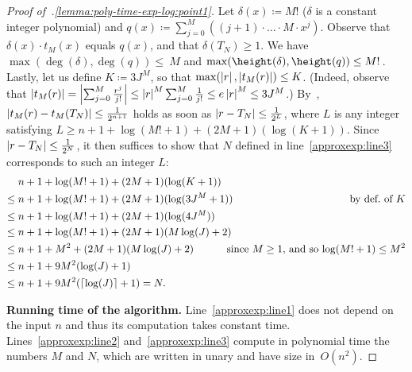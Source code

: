 \begin{proof}[Proof of~.\ref{lemma:poly-time-exp-log:point1}]
  Let $\delta(x) \coloneqq M!$ ($\delta$ is a constant integer polynomial) and
  $q(x) \coloneqq \sum_{j=0}^M ((j+1) \cdot {\dots} \cdot M \cdot x^j)$. Observe
  that $\delta(x) \cdot t_M(x)$ equals $q(x)$, and that $\delta(T_N) \geq 1$. We
  have $\max(\deg(\delta),\deg(q)) \leq~M$ and $\max(\height(\delta),\height(q))
  \leq M!\,$. Lastly, let us define $K \coloneqq 3J^M$, so that
  $\max(\left|r\right|,\left|t_M(r)\right|) \leq K$. (Indeed, observe that $\left|t_M(r)\right| =
  \left|\sum_{j=0}^M \frac{r^j}{j!}\right| \leq \left|r\right|^M \sum_{j=0}^M \frac{1}{j!}
  \leq e \left|r\right|^M \leq 3J^M$.) By~,
  $\left|t_M(r)-t_M(T_N)\right| \leq \frac{1}{2^{n+1}}$ holds as soon as $\left|r - T_N\right|
  \leq \frac{1}{2^{L}}$, where $L$ is any integer satisfying $L \geq  n+1 +
  \log(M!+1) + (2 M +1)(\log(K+1))$. Since $\left|r - T_N\right| \leq \frac{1}{2^{N}}$,
  it then suffices to show that $N$ defined in line~\ref{approxexp:line3}
  corresponds to such an integer $L$:
  \begin{align*}
    &n+1 + \log(M!+1) + (2 M +1)(\log(K+1))\\
    \leq{}& n+1 + \log(M!+1) + (2 M +1)(\log(3J^M+1))
      &\text{by def.~of $K$}\\
    \leq{}& n+1 + \log(M!+1) + (2 M +1)(\log(4J^M))\\
    \leq{}& n+1 + \log(M!+1) + (2 M +1)(M \log(J)+2)\\
    \leq{}& n+1 + M^2 + (2 M +1)(M \log(J)+2)
      &\hspace{-16pt}\text{since $M \geq 1$, and so $\log(M!+1) \leq M^2$}\\
    \leq{}& n+1 + 9M^2 (\log(J)+1) \\
    \leq{}& n +1 + 9M^2 (\ceil{\log(J)}+1) = N.
  \end{align*}

  \noindent
  \textbf{Running time of the algorithm.}
  Line~\ref{approxexp:line1} does not depend on the input $n$ and thus its
  computation takes constant time. Lines~\ref{approxexp:line2}
  and~\ref{approxexp:line3} compute in polynomial time the numbers $M$ and $N$,
  which are written in unary and have size in~$O(n^2)$. 
  

\end{proof}
